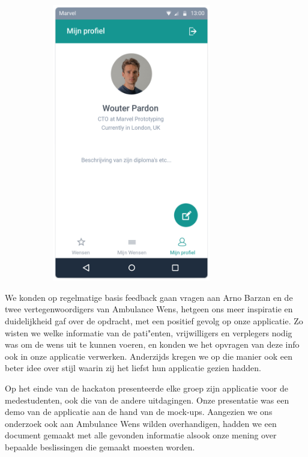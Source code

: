 \begin{figure}[!h]
\begin{subfigure}[h]{0.3\textwidth}
    \includegraphics[width=0.76\textwidth]{images/care-athon/profiel.png}
  \end{subfigure}
\end{figure}

We konden op regelmatige basis feedback gaan vragen aan Arno Barzan en de twee vertegenwoordigers van Ambulance Wens, hetgeen ons meer inspiratie en duidelijkheid gaf over de opdracht, met een positief gevolg op onze applicatie. Zo wisten we welke informatie van de pati"enten, vrijwilligers en verplegers nodig was om de wens uit te kunnen voeren, en konden we het opvragen van deze info ook in onze applicatie verwerken. Anderzijds kregen we op die manier ook een beter idee over stijl waarin zij het liefst hun applicatie gezien hadden.

Op het einde van de hackaton presenteerde elke groep zijn applicatie voor de medestudenten, ook die van de andere uitdagingen. Onze presentatie was een demo van de applicatie aan de hand van de mock\hyp{}ups. Aangezien we ons onderzoek ook aan Ambulance Wens wilden overhandigen, hadden we een document gemaakt met alle gevonden informatie alsook onze mening over bepaalde beslissingen die gemaakt moesten worden.

